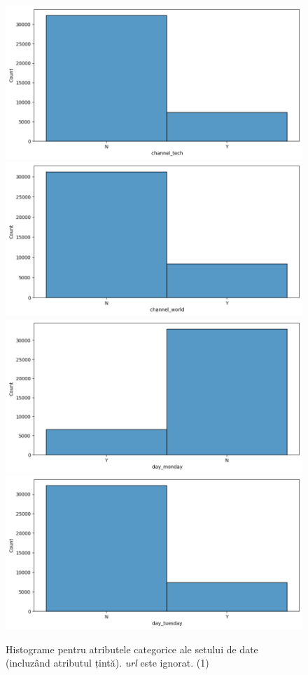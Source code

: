 \documentclass{article}
\begin{document}
\begin{figure}[htb]
    \includegraphics[scale=0.33]{news_popularity/analysis/categorical/channel_tech.png}
    \includegraphics[scale=0.33]{news_popularity/analysis/categorical/channel_world.png}
    \includegraphics[scale=0.33]{news_popularity/analysis/categorical/day_monday.png}
    \includegraphics[scale=0.33]{news_popularity/analysis/categorical/day_tuesday.png}
   \caption{Histograme pentru atributele categorice ale setului de date 
    (incluzând atributul țintă). \textit{url} este ignorat. (1)}
    \label{fig:news:cat_hists}
\end{figure}
\end{document}
